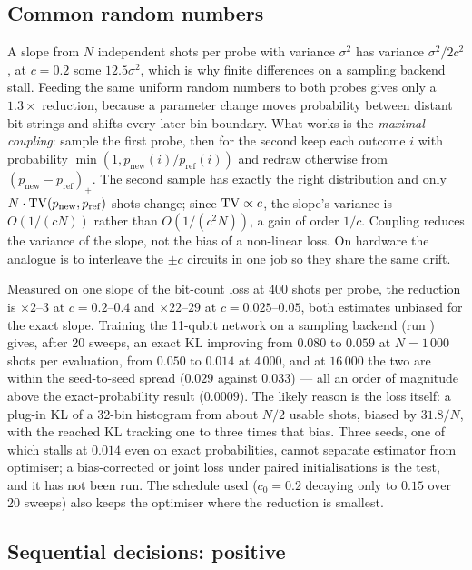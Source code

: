 \subsection{Common random numbers}
\label{app:crn}

A slope from $N$ independent shots per probe with variance $\sigma^2$ has variance
$\sigma^2/2c^2$, at $c=0.2$ some $12.5\sigma^2$, which is why finite differences on a sampling
backend stall.  Feeding the same uniform random numbers to both probes gives only a
$1.3\times$ reduction, because a parameter change moves probability between distant bit strings
and shifts every later bin boundary.  What works is the \emph{maximal coupling}: sample the
first probe, then for the second keep each outcome $i$ with probability
$\min(1,p_{\mathrm{new}}(i)/p_{\mathrm{ref}}(i))$ and redraw otherwise from
$(p_{\mathrm{new}}-p_{\mathrm{ref}})_+$.  The second sample has exactly the right distribution
and only $N\cdot\mathrm{TV}(p_{\mathrm{new}},p_{\mathrm{ref}})$ shots change; since $\mathrm{TV}\propto c$, the
slope's variance is $O(1/(cN))$ rather than $O(1/(c^2N))$, a gain of order $1/c$.  Coupling
reduces the variance of the slope, not the bias of a non-linear loss.  On hardware the analogue
is to interleave the $\pm c$ circuits in one job so they share the same drift.

Measured on one slope of the bit-count loss at 400 shots per probe, the reduction is
$\times2$--$3$ at $c=0.2$--$0.4$ and $\times22$--$29$ at $c=0.025$--$0.05$, both estimates
unbiased for the exact slope.  Training the 11-qubit network on a sampling backend (run
) gives, after 20 sweeps, an exact KL improving from
$0.080$ to $0.059$ at $N=1\,000$ shots per evaluation, from $0.050$ to $0.014$ at $4\,000$, and
at $16\,000$ the two are within the seed-to-seed spread ($0.029$ against $0.033$) --- all an
order of magnitude above the exact-probability result ($0.0009$).  The likely reason is the
loss itself: a plug-in KL of a 32-bin histogram from about $N/2$ usable shots, biased by
$31.8/N$, with the reached KL tracking one to three times that bias.  Three seeds, one of which
stalls at $0.014$ even on exact probabilities, cannot separate estimator from optimiser; a
bias-corrected or joint loss under paired initialisations is the test, and it has not been run.
The schedule used ($c_0=0.2$ decaying only to $0.15$ over 20 sweeps) also keeps the optimiser
where the reduction is smallest.

\subsection{Sequential decisions: positive}
\label{app:sprt}

